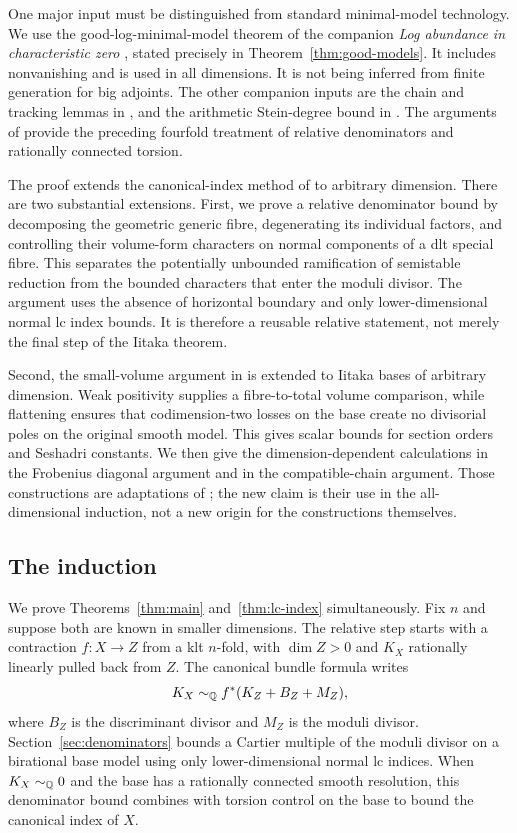 One major input must be distinguished from standard minimal-model
technology. We use the good-log-minimal-model theorem of the companion
\emph{Log abundance in characteristic zero}
\cite[Theorem~11.1]{LA}, stated precisely in
Theorem~\ref{thm:good-models}. It includes nonvanishing and is used in
all dimensions. It is not being inferred from finite generation for
big adjoints. The other companion inputs are the chain and tracking
lemmas in \cite{U4}, and the arithmetic Stein-degree bound in \cite{SD}.
The arguments of \cite{R4} provide the preceding fourfold treatment of
relative denominators and rationally connected torsion.

The proof extends the canonical-index method of \cite{U4} to arbitrary
dimension. There are two substantial extensions. First, we prove a
relative denominator bound by decomposing the geometric generic fibre,
degenerating its individual factors, and controlling their volume-form
characters on normal components of a dlt special fibre. This separates
the potentially unbounded ramification of semistable reduction from
the bounded characters that enter the moduli divisor. The argument
uses the absence of horizontal boundary and only lower-dimensional
normal lc index bounds. It is therefore a reusable relative statement,
not merely the final step of the Iitaka theorem.

Second, the small-volume argument in \cite{U4} is extended to Iitaka
bases of arbitrary dimension. Weak positivity supplies a fibre-to-total
volume comparison, while flattening ensures that codimension-two
losses on the base create no divisorial poles on the original smooth
model. This gives scalar bounds for section orders and Seshadri
constants. We then give the dimension-dependent calculations in the
Frobenius diagonal argument and in the compatible-chain argument.
Those constructions are adaptations of \cite{U4}; the new claim is
their use in the all-dimensional induction, not a new origin for the
constructions themselves.

\subsection{The induction}

We prove Theorems~\ref{thm:main} and~\ref{thm:lc-index} simultaneously.
Fix $n$ and suppose both are known in smaller dimensions. The relative
step starts with a contraction $f:X\to Z$ from a klt $n$-fold, with
$\dim Z>0$ and $K_X$ rationally linearly pulled back from $Z$.
The canonical bundle formula writes
\[
                    K_X\sim_{\mathbb Q}f^*(K_Z+B_Z+M_Z),
\]
where $B_Z$ is the discriminant divisor and $M_Z$ is the moduli
divisor. Section~\ref{sec:denominators} bounds a Cartier multiple of
the moduli divisor on a birational base model using only
lower-dimensional normal lc indices. When $K_X\sim_{\mathbb Q}0$ and the
base has a rationally connected smooth resolution, this denominator
bound combines with torsion control on the base to bound the canonical
index of $X$.

